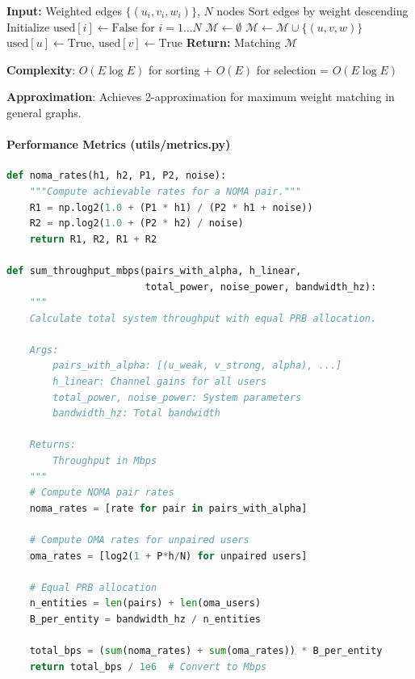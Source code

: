 \documentclass[12pt,a4paper]{article}
\begin{document}
\begin{algorithm}[H]
\caption{Greedy Maximum Weight Matching}
\begin{algorithmic}[1]
\State \textbf{Input:} Weighted edges $\{(u_i, v_i, w_i)\}$, $N$ nodes
\State Sort edges by weight descending
\State Initialize $\text{used}[i] \leftarrow \text{False}$ for $i = 1 \ldots N$
\State $\mathcal{M} \leftarrow \emptyset$ 
        \State $\mathcal{M} \leftarrow \mathcal{M} \cup \{(u,v,w)\}$
        \State $\text{used}[u] \leftarrow \text{True}$, $\text{used}[v] \leftarrow \text{True}$
    \EndIf
\EndFor
\State \textbf{Return:} Matching $\mathcal{M}$
\end{algorithmic}
\end{algorithm}

\textbf{Complexity}: $O(E \log E)$ for sorting + $O(E)$ for selection = $O(E \log E)$

\textbf{Approximation}: Achieves 2-approximation for maximum weight matching in general graphs.

\paragraph{Performance Metrics (utils/metrics.py)}

\begin{lstlisting}[language=Python]
def noma_rates(h1, h2, P1, P2, noise):
    """Compute achievable rates for a NOMA pair."""
    R1 = np.log2(1.0 + (P1 * h1) / (P2 * h1 + noise))
    R2 = np.log2(1.0 + (P2 * h2) / noise)
    return R1, R2, R1 + R2

def sum_throughput_mbps(pairs_with_alpha, h_linear, 
                        total_power, noise_power, bandwidth_hz):
    """
    Calculate total system throughput with equal PRB allocation.
    
    Args:
        pairs_with_alpha: [(u_weak, v_strong, alpha), ...]
        h_linear: Channel gains for all users
        total_power, noise_power: System parameters
        bandwidth_hz: Total bandwidth
    
    Returns:
        Throughput in Mbps
    """
    # Compute NOMA pair rates
    noma_rates = [rate for pair in pairs_with_alpha]
    
    # Compute OMA rates for unpaired users
    oma_rates = [log2(1 + P*h/N) for unpaired users]
    
    # Equal PRB allocation
    n_entities = len(pairs) + len(oma_users)
    B_per_entity = bandwidth_hz / n_entities
    
    total_bps = (sum(noma_rates) + sum(oma_rates)) * B_per_entity
    return total_bps / 1e6  # Convert to Mbps
\end{lstlisting}
\end{document}

